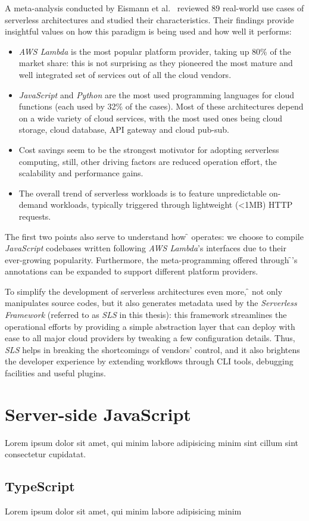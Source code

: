 A meta-analysis conducted by Eismann et al.~\cite{meta-analysis} reviewed
89 real-world use cases of serverless architectures and studied their characteristics.
Their findings provide insightful values on how this
paradigm is being used and how well it performs:
\begin{itemize}
  \item \textit{AWS Lambda} is the most popular platform provider, taking up 80\% of the market share:
    this is not surprising as they pioneered the most mature and well integrated set of services out of all
    the cloud vendors.
  \item \textit{JavaScript} and \textit{Python} are the most used
    programming languages for cloud functions (each used by 32\% of the cases).
    Most of these architectures depend on a wide variety of cloud services, with the most used
    ones being cloud storage, cloud database, API gateway and cloud pub-sub.
  \item Cost savings seem to be the strongest motivator for adopting serverless computing,
    still, other driving factors are reduced operation effort, the scalability and performance gains.
  \item The overall trend of serverless workloads is to feature unpredictable on-demand
  workloads, typically triggered through lightweight (<1MB) HTTP requests.
\end{itemize}

The first two points also serve to understand how \f{} operates:
we choose to compile \textit{JavaScript} codebases written following
\textit{AWS Lambda}'s interfaces due to their ever-growing popularity.
Furthermore, the meta-programming offered through \f{}'s annotations
can be expanded to support different platform providers.

To simplify the development of serverless architectures even more,
\f{} not only manipulates source codes, but it also generates metadata used
by the \textit{Serverless Framework} \cite{sls} (referred to as \textit{SLS} in this thesis):
this framework streamlines the operational efforts by providing a simple abstraction layer
that can deploy with ease to all major cloud providers by tweaking a few configuration details.
Thus, \textit{SLS} helps in breaking the shortcomings of vendors' control, and it also brightens
the developer experience by extending workflows through CLI tools, debugging facilities and useful plugins.

\section{Server-side JavaScript}

Lorem ipsum dolor sit amet, qui minim labore adipisicing minim sint cillum sint consectetur cupidatat.

\subsection{TypeScript}

Lorem ipsum dolor sit amet, qui minim labore adipisicing minim
